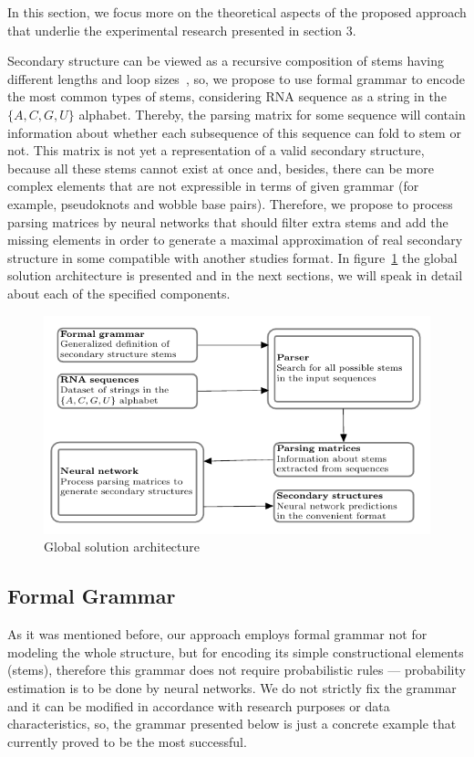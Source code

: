 In this section, we focus more on the theoretical aspects of the proposed approach that underlie the experimental research presented in section 3. 

Secondary structure can be viewed as a recursive composition of stems having different lengths and loop sizes~\cite{MQbioinformatics19}, so, we propose to use formal grammar to encode the most common types of stems, considering RNA sequence as a string in the $\{A, C, G, U\}$ alphabet. Thereby, the parsing matrix for some sequence will contain information about whether each subsequence of this sequence can fold to stem or not. This matrix is not yet a representation of a valid secondary structure, because all these stems cannot exist at once and, besides, there can be more complex elements that are not expressible in terms of given grammar (for example, pseudoknots and wobble base pairs). Therefore, we propose to process parsing matrices by neural networks that should filter extra stems and add the missing elements in order to generate a maximal approximation of real secondary structure in some compatible with another studies format. In figure~\ref{arch} the global solution architecture is presented and in the next sections, we will speak in detail about each of the specified components.

\begin{figure}[h]
\centering
\includegraphics[width=\textwidth]{pics/arch.pdf}
\caption{Global solution architecture}
\label{arch}
\end{figure}

\subsection{Formal Grammar}
As it was mentioned before, our approach employs formal grammar not for modeling the whole structure, but for encoding its simple constructional elements (stems), therefore this grammar does not require probabilistic rules --- probability estimation is to be done by neural networks. We do not strictly fix the grammar and it can be modified in accordance with research purposes or data characteristics, so, the grammar presented below is just a concrete example that currently proved to be the most successful. 

